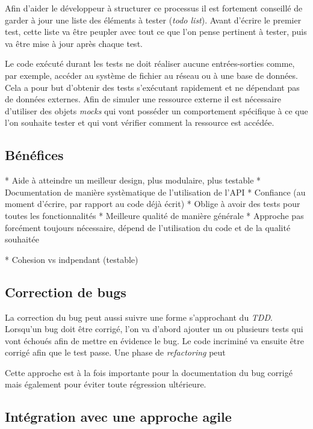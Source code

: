 \documentclass[journal, a4paper, frenchb]{IEEEtran}
\begin{document}
Afin d'aider le développeur à structurer ce processus il est fortement conseillé de garder à jour une liste des éléments à tester (\emph{todo list}). Avant d'écrire le premier test, cette liste va être peupler avec tout ce que l'on pense pertinent à tester, puis va être mise à jour après chaque test.

Le code exécuté durant les tests ne doit réaliser aucune entrées-sorties comme, par exemple, accéder au système de fichier au réseau ou à une base de données. Cela a pour but d'obtenir des tests s'exécutant rapidement et ne dépendant pas de données externes. Afin de simuler une ressource externe il est nécessaire d'utiliser des objets \emph{mocks} qui vont posséder un comportement spécifique à ce que l'on souhaite tester et qui vont vérifier comment la ressource est accédée.




\subsection{Bénéfices}


* Aide à atteindre un meilleur design, plus modulaire, plus testable
* Documentation de manière systèmatique de l'utilisation de l'API
* Confiance (au moment d'écrire, par rapport au code déjà écrit)
* Oblige à avoir des tests pour toutes les fonctionnalités
* Meilleure qualité de manière générale
* Approche pas forcément toujours nécessaire, dépend de l'utilisation du code et de la qualité souhaitée

* Cohesion vs indpendant (testable)


\subsection{Correction de bugs}

La correction du bug peut aussi suivre une forme s'approchant du \emph{TDD}. Lorsqu'un bug doit être corrigé, l'on va d'abord ajouter un ou plusieurs tests qui vont échoués afin de mettre en évidence le bug. Le code incriminé va ensuite être corrigé afin que le test passe. Une phase de \emph{refactoring} peut

Cette approche est à la fois importante pour la documentation du bug corrigé mais également pour éviter toute régression ultérieure.


\subsection{Intégration avec une approche agile}
\end{document}
